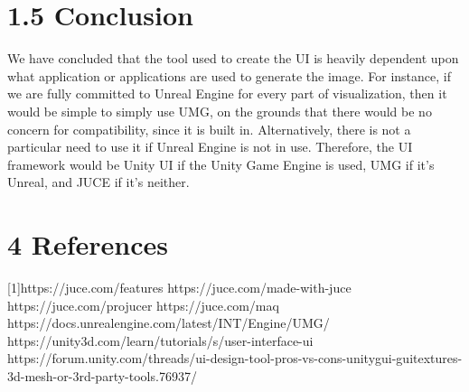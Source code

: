 \documentclass[onecolumn, draftclsnofoot,10pt, compsoc]{IEEEtran}
\begin{document}
\section{1.5 Conclusion}
We have concluded that the tool used to create the UI is heavily dependent upon what application or applications are used to generate the image. For instance, if we are fully committed to Unreal Engine for every part of visualization, then it would be simple to simply use UMG, on the grounds that there would be no concern for compatibility, since it is built in. Alternatively, there is not a particular need to use it if Unreal Engine is not in use. Therefore, the UI framework would be Unity UI if the Unity Game Engine is used, UMG if it's Unreal, and JUCE if it's neither.

\section{4 References}
[1]https://juce.com/features \newline
[2]https://juce.com/made-with-juce \newline
[3]https://juce.com/projucer \newline
[4]https://juce.com/maq \newline
[5]https://docs.unrealengine.com/latest/INT/Engine/UMG/ \newline
[6]https://unity3d.com/learn/tutorials/s/user-interface-ui \newline
[7]https://forum.unity.com/threads/ui-design-tool-pros-vs-cons-unitygui-guitextures-3d-mesh-or-3rd-party-tools.76937/
\end{document}
